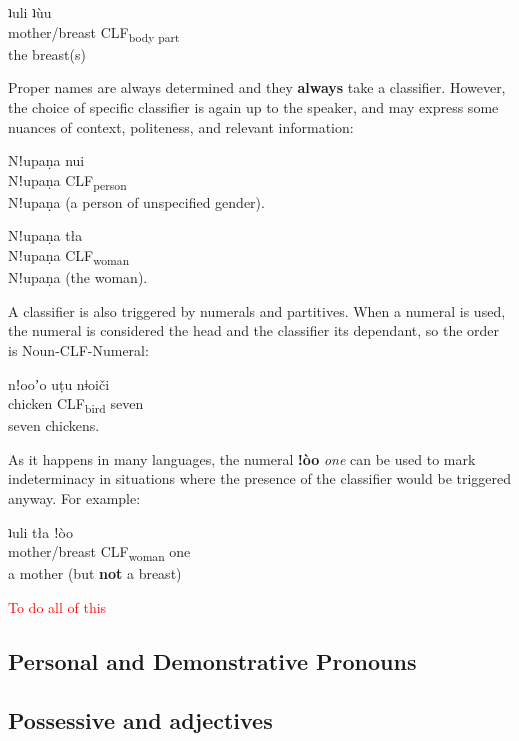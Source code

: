 \documentclass[11pt]{book}
\newcommand{\qcn}[1]{\textbf{#1}}
\newcommand{\transl}[2]{\qcn{#1} \emph{#2}}
\newcommand{\grammsc}[1]{\textsc{#1}}
\newcommand{\CLF}[1]{\grammsc{CLF}\textsubscript{#1}}
\newcommand{\cmnt}[1]{\textcolor{red}{#1}}
\begin{document}
\begin{exe}
\ex
\gll ʇuli ʇùu\\
mother/breast \CLF{body part}\\
\glt the breast(s)
\end{exe}

Proper names are always determined and they \textbf{always} take a classifier. However, the choice of specific classifier is again up to the speaker, and may express some nuances of context, politeness, and relevant information:

\begin{exe}
\ex
\gll Nǃupaṇa nui\\
Nǃupaṇa 	\CLF{person}\\
\glt Nǃupaṇa (a person of unspecified gender).
\end{exe}

\begin{exe}
\ex
\gll Nǃupaṇa 	tła\\
Nǃupaṇa 	\CLF{woman}\\
\glt Nǃupaṇa (the woman).
\end{exe}

A classifier is also triggered by numerals and partitives. When a numeral is used, the numeral is considered the head and the classifier its dependant, so the order is Noun-CLF-Numeral:

\begin{exe}
\ex
\gll nǃooʼo uṭu nǂoiči\\
chicken \CLF{bird} seven\\
\glt seven chickens.
\end{exe}

As it happens in many languages, the numeral \transl{ǃòo}{one} can be used to mark indeterminacy in situations where the presence of the classifier would be triggered anyway. For example:

\begin{exe}
\ex
\gll ʇuli tła ǃòo\\
mother/breast \CLF{woman} one\\
\glt a mother (but \textbf{not} a breast)
\end{exe}

\cmnt{To do all of this}

\subsection{Personal and Demonstrative Pronouns}

\subsection{Possessive and adjectives}
\end{document}
